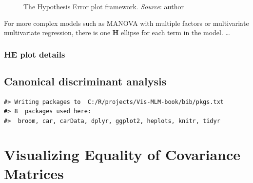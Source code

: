 \documentclass[
  letterpaper,
  10pt,
  krantz2]{krantz}
\begin{document}
\begin{figure}


\caption{\label{fig-HE-framework}The Hypothesis Error plot framework.
\emph{Source}: author}

\end{figure}%

For more complex models such as MANOVA with multiple factors or
multivariate multivariate regression, there is one \(\mathbf{H}\)
ellipse for each term in the model. \ldots{}

\subsection{HE plot details}\label{he-plot-details}

\section{Canonical discriminant analysis}\label{sec-candisc}

\begin{verbatim}
#> Writing packages to  C:/R/projects/Vis-MLM-book/bib/pkgs.txt
#> 8  packages used here:
#>  broom, car, carData, dplyr, ggplot2, heplots, knitr, tidyr
\end{verbatim}

\chapter{Visualizing Equality of Covariance Matrices}\label{sec-eqcov}
\end{document}
